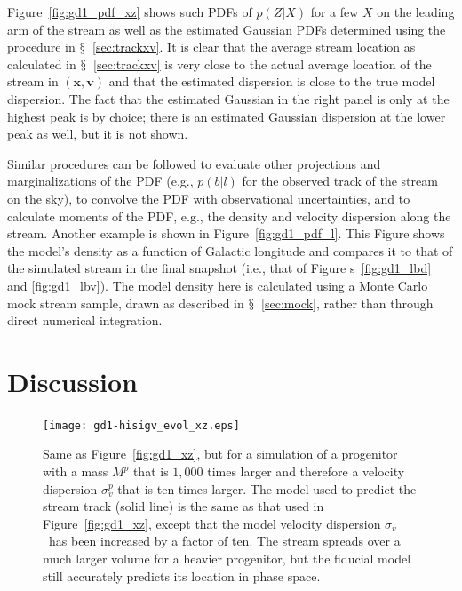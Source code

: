 \documentclass{emulateapj}
\newcommand{\ie}{i.e.}
\newcommand{\eg}{e.g.}
\renewcommand{\figurename}{Figure}
\newcommand{\sectionname}{$\mathsection$}
\renewcommand{\vec}[1]{\ensuremath{\mathbf{#1}}}
\newcommand{\vecx}{\ensuremath{\vec{x}}}
\newcommand{\vecv}{\ensuremath{\vec{v}}}
\newcommand{\sigv}{\ensuremath{\sigma_v}}
\begin{document}
\figurename~\ref{fig:gd1_pdf_xz} shows such PDFs of $p(Z|X)$ for a few
$X$ on the leading arm of the stream as well as the estimated Gaussian
PDFs determined using the procedure in
\sectionname~\ref{sec:trackxv}. It is clear that the average stream
location as calculated in \sectionname~\ref{sec:trackxv} is very close
to the actual average location of the stream in $(\vecx,\vecv)$ and
that the estimated dispersion is close to the true model
dispersion. The fact that the estimated Gaussian in the right panel is
only at the highest peak is by choice; there is an estimated Gaussian
dispersion at the lower peak as well, but it is not shown.

Similar procedures can be followed to evaluate other projections and
marginalizations of the PDF (\eg, $p(b|l)$ for the observed track of
the stream on the sky), to convolve the PDF with observational
uncertainties, and to calculate moments of the PDF, \eg, the density
and velocity dispersion along the stream. Another example is shown in
\figurename~\ref{fig:gd1_pdf_l}. This Figure shows the model's density
as a function of Galactic longitude and compares it to that of the
simulated stream in the final snapshot (\ie, that of \figurename
s~\ref{fig:gd1_lbd} and \ref{fig:gd1_lbv}). The model density here is
calculated using a Monte Carlo mock stream sample, drawn as described
in \sectionname~\ref{sec:mock}, rather than through direct numerical
integration.


\section{Discussion}\label{sec:discussion}

\begin{figure}[t!]
  \texttt{[image: gd1-hisigv\_evol\_xz.eps]}
  \caption{Same as \figurename~\ref{fig:gd1_xz}, but for a simulation
    of a progenitor with a mass $M^p$ that is $1,000$ times larger and
    therefore a velocity dispersion $\sigma_v^p$ that is ten times
    larger. The model used to predict the stream track (solid line) is
    the same as that used in \figurename~\ref{fig:gd1_xz}, except that
    the model velocity dispersion \sigv\ has been increased by a
    factor of ten. The stream spreads over a much larger volume for a
    heavier progenitor, but the fiducial model still accurately
    predicts its location in phase space.}\label{fig:gd1-hisigv_xz}
\end{figure}
\end{document}
